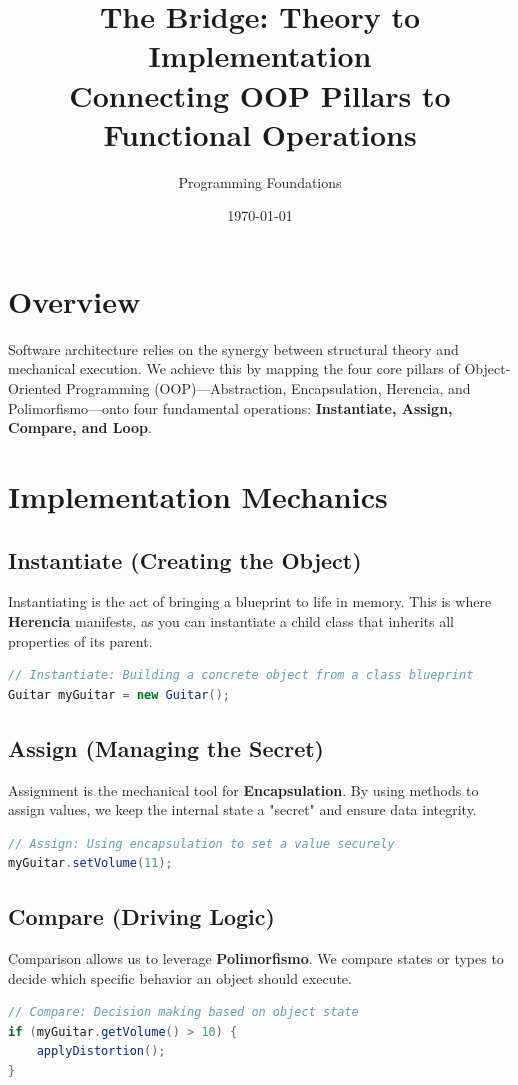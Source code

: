 \documentclass[12pt]{article}
\title{The Bridge: Theory to Implementation \\ \large Connecting OOP Pillars to Functional Operations}
\author{Programming Foundations}
\date{\today}
\begin{document}
\maketitle

\section{Overview}
Software architecture relies on the synergy between structural theory and mechanical execution. We achieve this by mapping the four core pillars of Object-Oriented Programming (OOP)---Abstraction, Encapsulation, Herencia, and Polimorfismo---onto four fundamental operations: \textbf{Instantiate, Assign, Compare, and Loop}.

\section{Implementation Mechanics}

\subsection{Instantiate (Creating the Object)}
Instantiating is the act of bringing a blueprint to life in memory. This is where \textbf{Herencia} manifests, as you can instantiate a child class that inherits all properties of its parent.
\begin{lstlisting}[language=Java]
// Instantiate: Building a concrete object from a class blueprint
Guitar myGuitar = new Guitar(); 
\end{lstlisting}

\subsection{Assign (Managing the Secret)}
Assignment is the mechanical tool for \textbf{Encapsulation}. By using methods to assign values, we keep the internal state a "secret" and ensure data integrity.
\begin{lstlisting}[language=Java]
// Assign: Using encapsulation to set a value securely
myGuitar.setVolume(11); 
\end{lstlisting}

\subsection{Compare (Driving Logic)}
Comparison allows us to leverage \textbf{Polimorfismo}. We compare states or types to decide which specific behavior an object should execute.
\begin{lstlisting}[language=Java]
// Compare: Decision making based on object state
if (myGuitar.getVolume() > 10) {
    applyDistortion();
}
\end{lstlisting}
\end{document}
